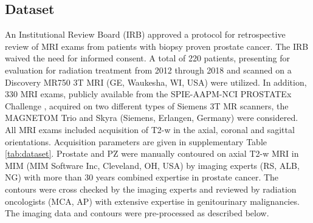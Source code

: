 \subsection{Dataset}
\label{subsec:dataset}
 An Institutional Review Board (IRB) approved a protocol for retrospective review of MRI exams from patients with biopsy proven prostate cancer. The IRB waived the need for informed consent. A total of 220 patients, presenting for evaluation for radiation treatment from 2012 through 2018 and scanned on a Discovery MR750 3T MRI (GE, Waukesha, WI, USA) were utilized. In addition, 330 MRI exams, publicly available from the SPIE-AAPM-NCI PROSTATEx Challenge \cite{litjens2014evaluation}, acquired on two different types of Siemens 3T MR scanners, the MAGNETOM Trio and Skyra (Siemens, Erlangen, Germany) were considered. All MRI exams included acquisition of T2-w in the axial, coronal and sagittal orientations. Acquisition parameters are given in supplementary Table \ref{tab:dataset}.
Prostate and PZ were manually contoured on axial T2-w MRI in MIM (MIM Software Inc, Cleveland, OH, USA) by imaging experts (RS, ALB, NG) with more than 30 years combined expertise in prostate cancer. The contours were cross checked by the imaging experts and reviewed by radiation oncologists (MCA, AP) with extensive expertise in genitourinary malignancies.
The imaging data and contours were pre-processed as described below.


